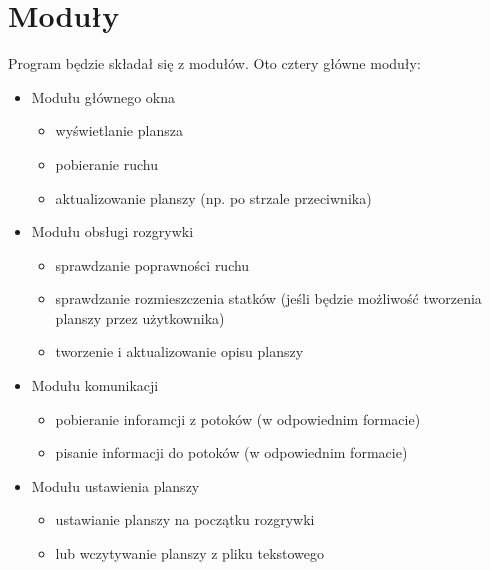 \documentclass[a4paper]{article}
\begin{document}
\section{Moduły}
Program będzie składał się z modułów. Oto cztery główne moduły:
\begin{itemize}
	\item Modułu głównego okna
	\begin{itemize}
		\item wyświetlanie plansza
		\item pobieranie ruchu
		\item aktualizowanie planszy (np. po strzale przeciwnika)
	\end{itemize}
	\item Modułu obsługi rozgrywki
	\begin{itemize}
		\item sprawdzanie poprawności ruchu
		\item sprawdzanie rozmieszczenia statków (jeśli będzie możliwość tworzenia planszy przez użytkownika)
		\item tworzenie i aktualizowanie opisu planszy
	\end{itemize}
	\item Modułu komunikacji
	\begin{itemize}
		\item pobieranie inforamcji z potoków (w odpowiednim formacie)
		\item pisanie informacji do potoków (w odpowiednim formacie)
	\end{itemize}
	\item Modułu ustawienia planszy
	\begin{itemize}
		\item ustawianie planszy na początku rozgrywki
		\item lub wczytywanie planszy z pliku tekstowego
	\end{itemize}
\end{itemize}
\end{document}
